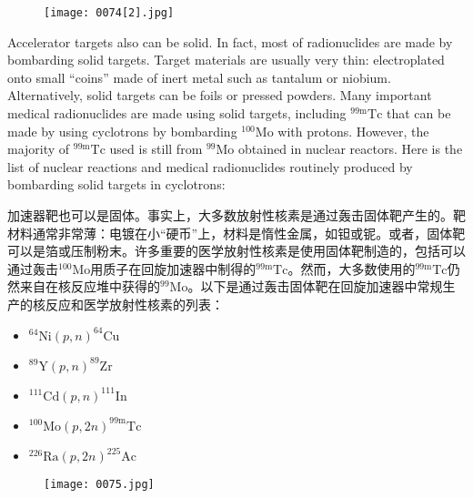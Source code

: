 \documentclass[dvipsnames, svgnames,a4paper,11pt]{article}
\begin{document}
\begin{figure}[ht]
    \centering
    \texttt{[image: 0074[2].jpg]}
     \label{fig68}
\end{figure}

Accelerator targets also can be solid. In fact, most of radionuclides are made by bombarding solid targets. Target materials are usually very thin: electroplated onto small “coins” made of inert metal such as tantalum or niobium. Alternatively, solid targets can be foils or pressed powders. Many important medical radionuclides are made using solid targets, including $^{99\text{m}}\text{Tc}$ that can be made by using cyclotrons by bombarding $^{100}\text{Mo}$ with protons. However, the majority of $^{99\text{m}}\text{Tc}$ used is still from $^{99}\text{Mo}$ obtained in nuclear reactors. Here is the list of nuclear reactions and medical radionuclides routinely produced by bombarding solid targets in cyclotrons:

加速器靶也可以是固体。事实上，大多数放射性核素是通过轰击固体靶产生的。靶材料通常非常薄：电镀在小“硬币”上，材料是惰性金属，如钽或铌。或者，固体靶可以是箔或压制粉末。许多重要的医学放射性核素是使用固体靶制造的，包括可以通过轰击$^{100}\text{Mo}$用质子在回旋加速器中制得的$^{99\text{m}}\text{Tc}$。然而，大多数使用的$^{99\text{m}}\text{Tc}$仍然来自在核反应堆中获得的$^{99}\text{Mo}$。以下是通过轰击固体靶在回旋加速器中常规生产的核反应和医学放射性核素的列表：

\begin{itemize}
    \item $^{64}\text{Ni}(p,n)^{64}\text{Cu}$
    \item $^{89}\text{Y}(p,n)^{89}\text{Zr}$
    \item $^{111}\text{Cd}(p,n)^{111}\text{In}$
    \item $^{100}\text{Mo}(p,2n)^{99\text{m}}\text{Tc}$
    \item $^{226}\text{Ra}(p,2n)^{225}\text{Ac}$
\end{itemize}

\begin{figure}[ht]
    \centering
    \texttt{[image: 0075.jpg]}
     \label{fig69}
\end{figure}
\end{document}
